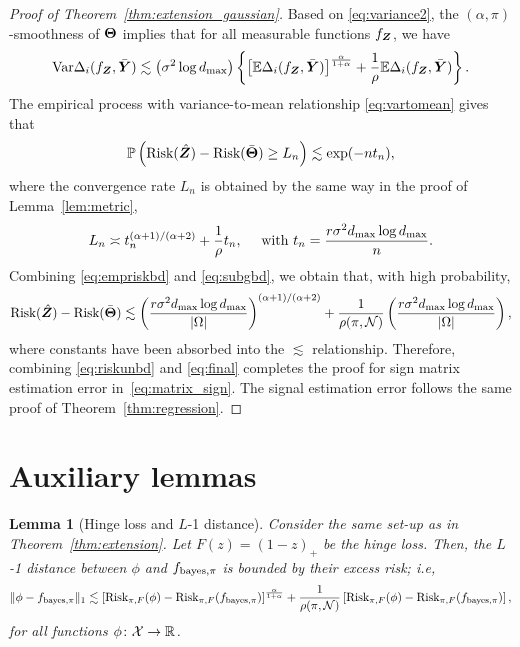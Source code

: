 \documentclass[11pt]{article}
\theoremstyle{plain}
\newtheorem{lem}{Lemma}
\theoremstyle{definition}
\def\bayespif{f_{\textup{bayes},\pi}}
\def\riskF{\textup{Risk}_{\pi,F}}
\begin{document}
\begin{proof}[Proof of Theorem~\ref{thm:extension_gaussian}]
Based on \eqref{eq:variance2}, the $(\alpha,\pi)$-smoothness of $\bm{\Theta}$ implies that for all measurable functions $f_{\bm Z}$, we have
\begin{align}\label{eq:vartomean}
\text{Var}\Delta_i(f_{\bm Z},\bar {\bm Y})\lesssim \left(\sigma^2\log d_{\max}\right) \left\{\left[\mathbb{E}\Delta_i(f_{\bm Z},\bar{\bm Y})\right]^{\alpha\over1+\alpha}+\frac{1}{\rho}\mathbb{E}\Delta_i(f_{\bm Z},\bar{\bm Y})\right\}.
\end{align}
The empirical process with variance-to-mean relationship \eqref{eq:vartomean} gives that
\begin{align}\label{eq:empriskbd}
\mathbb{P	}\left(\text{Risk}(\hat{\bm Z})-\text{Risk}(\bar{\bm{\Theta}})\geq L_n\right)\lesssim \exp(-nt_n),
\end{align}
where the convergence rate $L_n$ is obtained by the same way in the proof of Lemma~\ref{lem:metric}, 
\begin{align}\label{eq:subgbd}
L_n\asymp t_n^{(\alpha+1)/(\alpha+2)}+\frac{1}{\rho}t_n,\quad\text{ with } t_n =  {r \sigma^2 d_{\max}\log d_{\max}  \over n}.
\end{align}
Combining \eqref{eq:empriskbd} and \eqref{eq:subgbd}, we obtain that, with high probability, 
\begin{align}\label{eq:riskunbd}
   \text{Risk}(\hat{\bm Z})-\text{Risk}(\bar{\bm{\Theta}})\lesssim \left( {r \sigma^2  d_{\max}\log d_{\max}  \over |\Omega|}\right)^{(\alpha+1)/(\alpha+2)}+\frac{1}{\rho(\pi,\mathcal{N})} \left({r \sigma^2  d_{\max} \log d_{\max} \over |\Omega|} \right),
\end{align} 
where constants have been absorbed into the $\lesssim$ relationship. Therefore, combining \eqref{eq:riskunbd} and \eqref{eq:final} completes the proof for sign matrix estimation error in~\eqref{eq:matrix_sign}. The signal estimation error follows the same proof of Theorem~\ref{thm:regression}.
\end{proof}

\clearpage
\section{Auxiliary lemmas}

\begin{lem}[Hinge loss and $L$-1 distance]\label{lem:hingeL1} Consider the same set-up as in Theorem~\ref{thm:extension}. Let $F(z)=(1-z)_{+}$ be the hinge loss. Then, the $L$-1 distance between $\phi$ and $\bayespif$ is bounded by their excess risk; i.e,
\begin{equation}\label{eq:L}
\onenormSize{}{\phi-\bayespif}
\lesssim
\left[\riskF(\phi)-\riskF(\bayespif)\right]^{\alpha\over 1+\alpha}+
 {1\over \rho(\pi, \tN)}\left[\riskF(\phi)-\riskF(\bayespif)\right],
\end{equation}
for all functions $\phi\colon \mathcal{X}\to\mathbb{R}$.
\end{lem}
\end{document}
